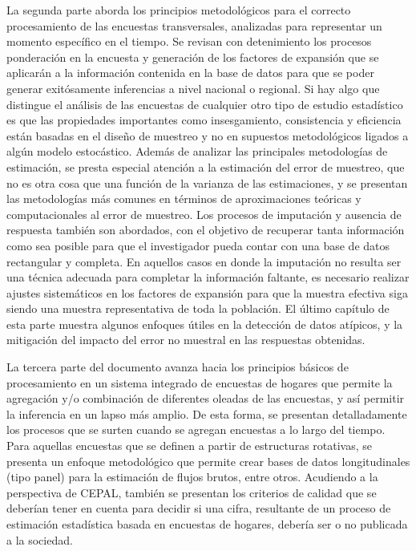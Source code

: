 \documentclass[
  12pt,
  spanish,
]{book}
\begin{document}
La segunda parte aborda los principios metodológicos para el correcto procesamiento de las encuestas transversales, analizadas para representar un momento específico en el tiempo. Se revisan con detenimiento los procesos ponderación en la encuesta y generación de los factores de expansión que se aplicarán a la información contenida en la base de datos para que se poder generar exitósamente inferencias a nivel nacional o regional. Si hay algo que distingue el análisis de las encuestas de cualquier otro tipo de estudio estadístico es que las propiedades importantes como insesgamiento, consistencia y eficiencia están basadas en el diseño de muestreo y no en supuestos metodológicos ligados a algún modelo estocástico. Además de analizar las principales metodologías de estimación, se presta especial atención a la estimación del error de muestreo, que no es otra cosa que una función de la varianza de las estimaciones, y se presentan las metodologías más comunes en términos de aproximaciones teóricas y computacionales al error de muestreo. Los procesos de imputación y ausencia de respuesta también son abordados, con el objetivo de recuperar tanta información como sea posible para que el investigador pueda contar con una base de datos rectangular y completa. En aquellos casos en donde la imputación no resulta ser una técnica adecuada para completar la información faltante, es necesario realizar ajustes sistemáticos en los factores de expansión para que la muestra efectiva siga siendo una muestra representativa de toda la población. El último capítulo de esta parte muestra algunos enfoques útiles en la detección de datos atípicos, y la mitigación del impacto del error no muestral en las respuestas obtenidas.

La tercera parte del documento avanza hacia los principios básicos de procesamiento en un sistema integrado de encuestas de hogares que permite la agregación y/o combinación de diferentes oleadas de las encuestas, y así permitir la inferencia en un lapso más amplio. De esta forma, se presentan detalladamente los procesos que se surten cuando se agregan encuestas a lo largo del tiempo. Para aquellas encuestas que se definen a partir de estructuras rotativas, se presenta un enfoque metodológico que permite crear bases de datos longitudinales (tipo panel) para la estimación de flujos brutos, entre otros. Acudiendo a la perspectiva de CEPAL, también se presentan los criterios de calidad que se deberían tener en cuenta para decidir si una cifra, resultante de un proceso de estimación estadística basada en encuestas de hogares, debería ser o no publicada a la sociedad.
\end{document}
